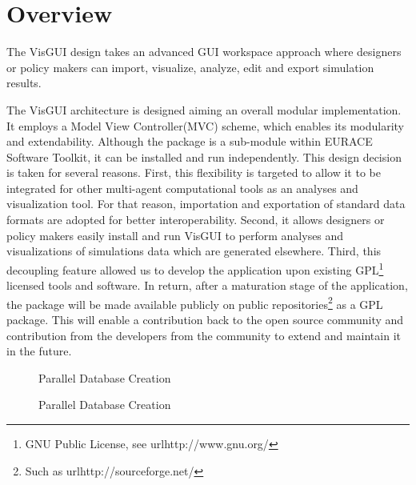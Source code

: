 \section{Overview}
The VisGUI design takes an advanced GUI workspace approach where designers or policy makers can import, visualize, analyze, edit and export simulation results.

The VisGUI architecture is designed aiming an overall modular implementation. It employs a Model View Controller(MVC) scheme, which enables its modularity and extendability. Although the package is a sub-module within EURACE Software Toolkit, it can be installed and run independently. This design decision is taken for several reasons. First, this flexibility is targeted to allow it to be integrated for other multi-agent computational tools as an analyses and visualization tool. For that reason, importation and exportation of standard data formats are adopted for better interoperability. Second, it allows designers or policy makers easily install and run VisGUI to perform analyses and visualizations of simulations data which are generated elsewhere. Third, this decoupling feature allowed us to develop the application upon existing GPL\footnote{GNU Public License, see url{http://www.gnu.org/}} licensed tools and software. In return, after a maturation stage of the application, the package will be made available publicly on public repositories\footnote{Such as url{http://sourceforge.net/}} as a GPL package. This will enable a contribution back to the open source community and contribution from the developers from the community to extend and maintain it in the future.
\begin{figure}[h]
  \centering
{}
  \caption{Parallel Database Creation}
  \label{figure:db}
\end{figure}
\begin{figure}[h]
  \centering
{}
  \caption{Parallel Database Creation}
  \label{figure:db2}
\end{figure}

